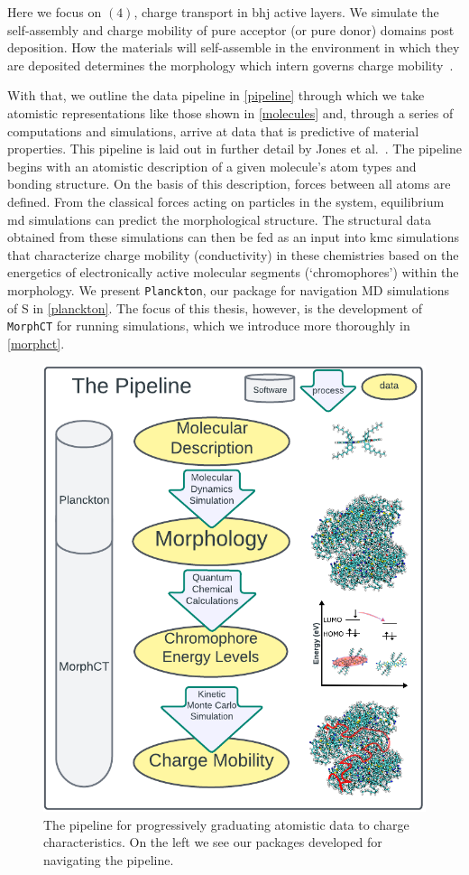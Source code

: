 Here we focus on $(4)$, charge transport in \gls{bhj} active layers.
We simulate the self-assembly and charge mobility of pure acceptor (or
pure donor) domains post deposition. 
How the materials will self-assemble in the environment in which they are deposited determines
the morphology which intern governs charge mobility~\cite{Vanlaeke2006}\cite{McMahon2011}. 

With that, we outline the data pipeline in \autoref{pipeline} through which we take atomistic representations like
those shown in \autoref{molecules} and, through a series of computations and simulations,
arrive at data that is predictive of material properties. 
This pipeline is laid out in further detail by Jones et al.~\cite{Jones2017}.
The pipeline begins with an atomistic description of a given molecule's atom types and bonding structure.
On the basis of this description, forces between all atoms are defined. From the classical forces acting on
particles in the system,  equilibrium \gls{md} simulations can predict the morphological structure. 
The structural data obtained from these simulations can then be fed as an input into \gls{kmc}
simulations that characterize charge mobility (conductivity) in these chemistries based on the
energetics of electronically active molecular segments (`chromophores') within the morphology.
We present \texttt{Planckton}, our package for navigation MD simulations of S in \autoref{planckton}. 
The focus of this thesis, however, is the development of \texttt{MorphCT} for running  simulations, which we
introduce more thoroughly in \autoref{morphct}.

\begin{figure}
  \center
  \includegraphics[width=0.9\linewidth]{figures/the-pipeline.png} 
    \caption{The pipeline for progressively graduating atomistic data to charge characteristics. On the left
    we see our packages developed for navigating the pipeline.}
  \label{pipeline}
\end{figure}

